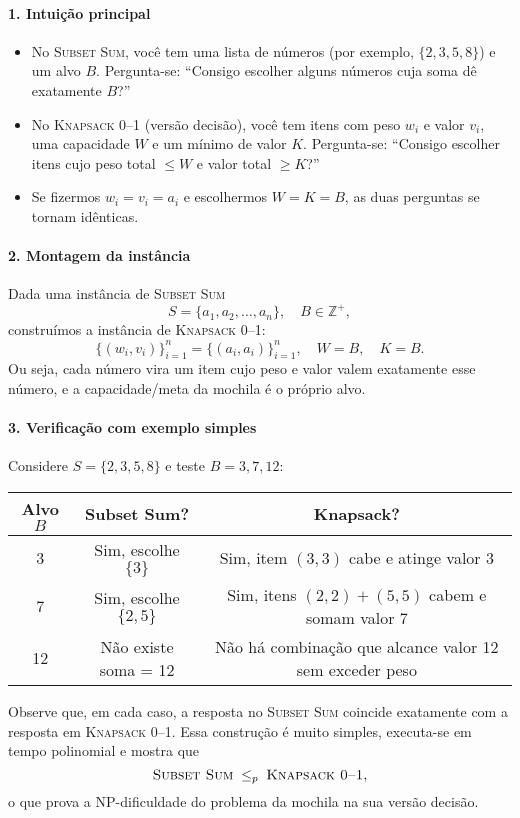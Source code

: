 \paragraph{1. Intuição principal}
\begin{itemize}
  \item No \textsc{Subset Sum}, você tem uma lista de números (por exemplo, \(\{2,3,5,8\}\)) e um alvo \(B\). Pergunta-se: “Consigo escolher alguns números cuja soma dê exatamente \(B\)?”
  \item No \textsc{Knapsack 0--1} (versão decisão), você tem itens com peso \(w_i\) e valor \(v_i\), uma capacidade \(W\) e um mínimo de valor \(K\). Pergunta-se: “Consigo escolher itens cujo peso total \(\le W\) e valor total \(\ge K\)?”
  \item Se fizermos \(w_i = v_i = a_i\) e escolhermos \(W = K = B\), as duas perguntas se tornam idênticas.
\end{itemize}

\paragraph{2. Montagem da instância}
Dada uma instância de \textsc{Subset Sum}
\[S = \{a_1,a_2,\dots,a_n\},\quad B\in\mathbb{Z}^+,\]
construímos a instância de \textsc{Knapsack 0--1}:
\[\bigl\{(w_i,v_i)\bigr\}_{i=1}^n = \bigl\{(a_i,a_i)\bigr\}_{i=1}^n,\quad W = B,\quad K = B.\]
Ou seja, cada número vira um item cujo peso e valor valem exatamente esse número, e a capacidade/meta da mochila é o próprio alvo.

\paragraph{3. Verificação com exemplo simples}
Considere \(S=\{2,3,5,8\}\) e teste \(B=3,7,12\):
\begin{center}
\begin{tabular}{c|c|c}
\textbf{Alvo \(B\)} & \textbf{Subset Sum?} & \textbf{Knapsack?} \\\hline
3  & Sim, escolhe \(\{3\}\)      & Sim, item \((3,3)\) cabe e atinge valor 3 \\
7  & Sim, escolhe \(\{2,5\}\)    & Sim, itens \((2,2)+(5,5)\) cabem e somam valor 7 \\
12 & Não existe soma = 12        & Não há combinação que alcance valor 12 sem exceder peso
\end{tabular}
\end{center}

Observe que, em cada caso, a resposta no \textsc{Subset Sum} coincide exatamente com a resposta em \textsc{Knapsack 0--1}. Essa construção é muito simples, executa-se em tempo polinomial e mostra que
\[\textsc{Subset Sum} \;\le_p\; \textsc{Knapsack 0--1},\]
o que prova a NP-dificuldade do problema da mochila na sua versão decisão.






